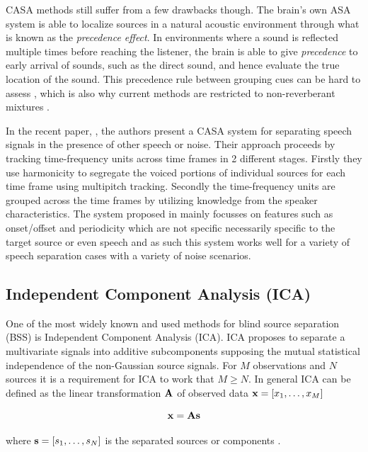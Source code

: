 CASA methods still suffer from a few drawbacks though. The brain's own ASA system is able to localize sources in a natural acoustic environment through what is known as the \emph{precedence effect}. In environments where a sound is reflected multiple times before reaching the listener, the brain is able to give \emph{precedence} to early arrival of sounds, such as the direct sound, and hence evaluate the true location of the sound. This precedence rule between grouping cues can be hard to assess \citep{Wang2006}, which is also why current methods are restricted to non-reverberant mixtures \citep{Vincent2006}.

In the recent paper, \cite{Shao2010}, the authors present a CASA system for separating speech signals in the presence of other speech or noise. Their approach proceeds by tracking time-frequency units across time frames in 2 different stages. Firstly they use harmonicity to segregate the voiced portions of individual sources for each time frame using multipitch tracking. Secondly the time-frequency units are grouped across the time frames by utilizing knowledge from the speaker characteristics. The system proposed in \cite{Shao2010} mainly focusses on features such as onset/offset and periodicity which are not specific necessarily specific to the target source or even speech and as such this system works well for a variety of speech separation cases with a variety of noise scenarios.

\subsection{Independent Component Analysis (ICA)}
One of the most widely known and used methods for blind source separation (BSS) is Independent Component Analysis (ICA). ICA proposes to separate a multivariate signals into additive subcomponents supposing the mutual statistical independence of the non-Gaussian source signals. For $M$ observations and $N$ sources it is a requirement for ICA to work that $M\geq N$.
In general ICA can be defined as the linear transformation $\textrm{\textbf{A}}$ of observed data $\textrm{\textbf{x}} = [x_1,\ldots,x_M]$

\begin{equation}\label{eq:ICA1}
    \textrm{\textbf{x}} = \textrm{\textbf{A}}\textrm{\textbf{s}}
\end{equation}

where $\textrm{\textbf{s}}  = [s_1,\ldots,s_N]$ is the separated sources or components \citep{Virtanen2007}.

